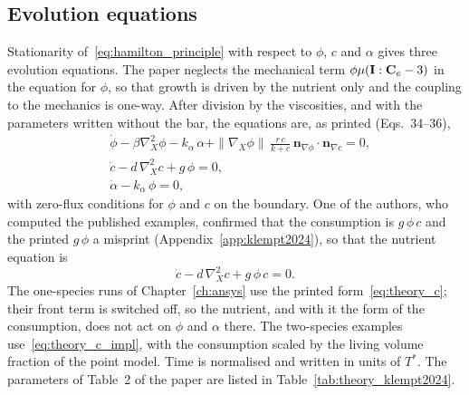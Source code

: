 \subsection{Evolution equations}

Stationarity of~\eqref{eq:hamilton_principle} with respect to $\phi$, $c$ and
$\alpha$ gives three evolution equations. The paper neglects the mechanical
term $\phi\mu(\mathbf{I}:\mathbf C_e-3)$ in the equation for $\phi$, so that growth
is driven by the nutrient only and the coupling to the mechanics is one-way.
After division by the viscosities, and with the parameters written without the
bar, the equations are, as printed (Eqs.~34--36),
\begin{align}
  &\dot\phi-\beta\nabla_X^2\phi-k_\alpha\,\alpha
   +\|\nabla_X\phi\|\,\frac{r\,c}{k+c}\,\mathbf n_{\nabla\phi}\cdot\mathbf n_{\nabla c}=0,
   \label{eq:theory_phi}\\
  &\dot c-d\,\nabla_X^2 c+g\,\phi=0,
   \label{eq:theory_c}\\
  &\dot\alpha-k_\alpha\,\phi=0,
   \label{eq:theory_alpha}
\end{align}
with zero-flux conditions for $\phi$ and $c$ on the boundary. One of the authors, who
computed the published examples, confirmed that the consumption is $g\,\phi\,c$ and the
printed $g\,\phi$ a misprint (Appendix~\ref{app:klempt2024}), so that the nutrient equation is
\begin{equation}
  \dot c-d\,\nabla_X^2 c+g\,\phi\,c=0.
  \label{eq:theory_c_impl}
\end{equation}
The one-species runs of Chapter~\ref{ch:ansys} use the printed form~\eqref{eq:theory_c}; their front
term is switched off, so the nutrient, and with it the form of the consumption, does not act on $\phi$
and $\alpha$ there. The two-species examples use~\eqref{eq:theory_c_impl}, with the
consumption scaled by the living volume fraction of the point model. Time is
normalised and written in units of $T^*$. The parameters of Table~2 of the paper are listed in
Table~\ref{tab:theory_klempt2024}.

